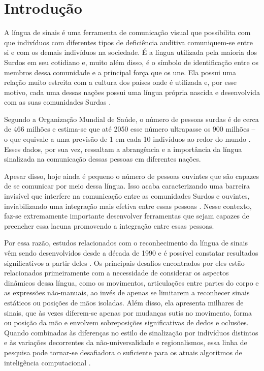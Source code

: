 \section{Introdução} %
\label{sec:introducao}

A língua de sinais é uma ferramenta de comunicação visual que possibilita com que indivíduos com diferentes tipos de deficiência auditiva comuniquem-se entre si e com os demais indivíduos na sociedade. É a língua utilizada pela maioria dos Surdos em seu cotidiano e, muito além disso, é o símbolo de identificação entre os membros dessa comunidade e a principal força que os une. 
Ela possui uma relação muito estreita com a cultura dos países onde é utilizada e, por esse motivo, cada uma dessas nações possui uma língua própria nascida e desenvolvida com as suas comunidades Surdas \cite{pereira-choi-2011}.

Segundo a Organização Mundial de Saúde, o número de pessoas surdas é de cerca de 466 milhões e estima-se que até 2050 esse número ultrapasse os 900 milhões -- o que equivale a uma previsão de 1 em cada 10 indivíduos ao redor do mundo \cite{who-2018}. Esses dados, por sua vez, ressaltam a abrangência e a importância da língua sinalizada na comunicação dessas pessoas em diferentes nações. 

Apesar disso, hoje ainda é pequeno o número de pessoas ouvintes que são capazes de se comunicar por meio dessa língua. Isso acaba caracterizando uma barreira invisível que interfere na comunicação entre as comunidades Surdos e ouvintes, inviabilizando uma integração mais efetiva entre essas pessoas \cite{peres-2006}. Nesse contexto, faz-se extremamente importante desenvolver ferramentas que sejam capazes de preencher essa lacuna promovendo a integração entre essas pessoas. 

Por essa razão, estudos relacionados com o reconhecimento da língua de sinais vêm sendo desenvolvidos desde a década de 1990 e é possível constatar resultados significativos a partir deles \cite{lim-2016, recent-advances-dl-2017}. Os principais desafios encontrados por eles estão relacionados primeiramente com a necessidade de considerar os aspectos dinâmicos dessa língua, como os movimentos, articulações entre partes do corpo e as expressões não-manuais, ao invés de apenas se limitarem a reconhecer sinais estáticos ou posições de mãos isoladas. Além disso, ela apresenta milhares de sinais, que às vezes diferem-se apenas por mudanças sutis no movimento, forma ou posição da mão e envolvem sobreposições significativas de dedos e oclusões. Quando combinadas às diferenças no estilo de sinalização por indivíduos distintos e às variações decorrentes da não-universalidade e regionalismos, essa linha de pesquisa pode tornar-se desafiadora o suficiente para os atuais algoritmos de inteligência computacional \cite{konstantinidis-2018}.

